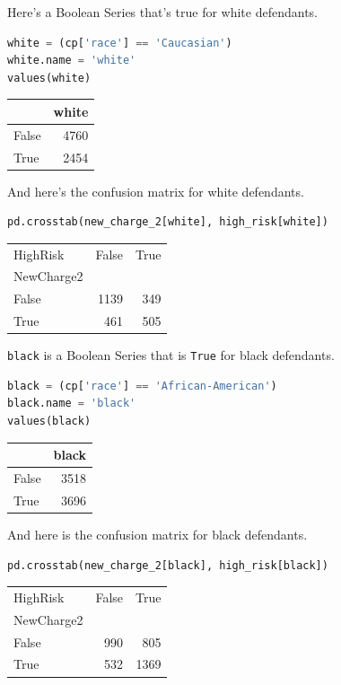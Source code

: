 Here's a Boolean Series that's true for white defendants.

\begin{lstlisting}[language=Python]
white = (cp['race'] == 'Caucasian')
white.name = 'white'
values(white)
\end{lstlisting}

\begin{tabular}{lr}
\toprule
{} &  white \\
\midrule
False &   4760 \\
True  &   2454 \\
\bottomrule
\end{tabular}

And here's the confusion matrix for white defendants.

\begin{lstlisting}[language=Python]
pd.crosstab(new_charge_2[white], high_risk[white])
\end{lstlisting}

\begin{tabular}{lrr}
\toprule
HighRisk &  False &  True  \\
NewCharge2 &        &        \\
\midrule
False      &   1139 &    349 \\
True       &    461 &    505 \\
\bottomrule
\end{tabular}

\passthrough{\lstinline!black!} is a Boolean Series that is
\passthrough{\lstinline!True!} for black defendants.

\begin{lstlisting}[language=Python]
black = (cp['race'] == 'African-American')
black.name = 'black'
values(black)
\end{lstlisting}

\begin{tabular}{lr}
\toprule
{} &  black \\
\midrule
False &   3518 \\
True  &   3696 \\
\bottomrule
\end{tabular}

And here is the confusion matrix for black defendants.

\begin{lstlisting}[language=Python]
pd.crosstab(new_charge_2[black], high_risk[black])
\end{lstlisting}

\begin{tabular}{lrr}
\toprule
HighRisk &  False &  True  \\
NewCharge2 &        &        \\
\midrule
False      &    990 &    805 \\
True       &    532 &   1369 \\
\bottomrule
\end{tabular}

